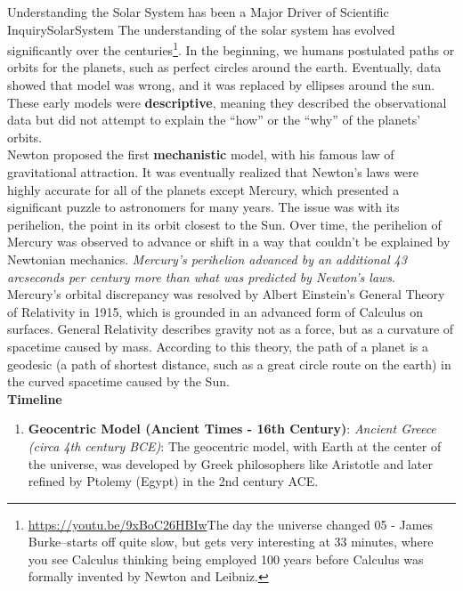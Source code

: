\begin{funColor}{Understanding the Solar System has been a Major Driver of Scientific Inquiry}{SolarSystem}
The understanding of the solar system has evolved significantly over the centuries\footnote{\url{https://youtu.be/9xBoC26HBIw}{The day the universe changed 05 - James Burke}--starts off quite slow, but gets very interesting at 33 minutes, where you see Calculus thinking being employed 100 years before Calculus was formally invented by Newton and Leibniz.}. In the beginning, we humans postulated paths or orbits for the planets, such as perfect circles around the earth. Eventually, data showed that model was wrong, and it was replaced by ellipses around the sun. These early models were \textbf{descriptive}, meaning they described the observational data but did not attempt to explain the ``how'' or the ``why'' of the planets' orbits. \\

Newton proposed the first \textbf{mechanistic} model, with his famous law of gravitational attraction. It was eventually realized that Newton's laws were highly accurate for all of the planets except Mercury, which presented a significant puzzle to astronomers for many years. The issue was with its perihelion, the point in its orbit closest to the Sun. Over time, the perihelion of Mercury was observed to advance or shift in a way that couldn't be explained by Newtonian mechanics. \textit{Mercury's perihelion advanced by an additional 43 arcseconds per century more than what was predicted by Newton's laws}.\\

Mercury's orbital discrepancy was resolved by Albert Einstein's General Theory of Relativity in 1915, which is grounded in an advanced form of Calculus on surfaces. General Relativity describes gravity not as a force, but as a curvature of spacetime caused by mass. According to this theory, the path of a planet is a geodesic (a path of shortest distance, such as a great circle route on the earth) in the curved spacetime caused by the Sun. \\

\textbf{Timeline}
\begin{enumerate}
    \item \textbf{Geocentric Model (Ancient Times - 16th Century)}:  \textit{Ancient Greece (circa 4th century BCE)}: The geocentric model, with Earth at the center of the universe, was developed by Greek philosophers like Aristotle and later refined by Ptolemy (Egypt) in the 2nd century ACE.
        

\end{enumerate}
\end{funColor}
